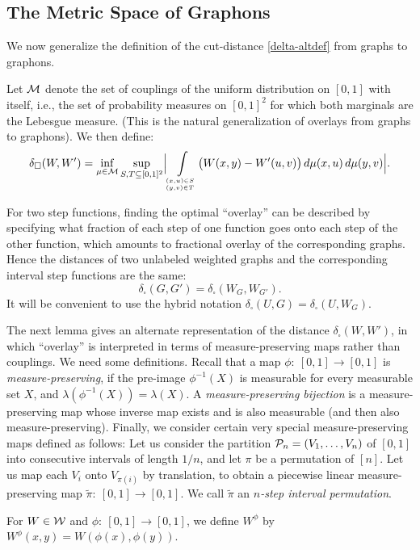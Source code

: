 \documentclass[12pt]{article}
\numberwithin{equation}{section}
\def\MM{{\cal M}}\def\NN{{\cal N}}\def\OO{{\cal O}}
\def\PP{{\cal P}}\def\QQ{{\cal Q}}\def\RR{{\cal R}}
\def\ontop#1#2{\genfrac{}{}{0pt}{}{#1}{#2}}
\begin{document}
\subsection{The Metric Space of Graphons}
\label{sec:FunctDist}

We now generalize the definition of the cut-distance
\eqref{delta-altdef}  from graphs to graphons.

Let $\MM$ denote the set of couplings of the uniform distribution on
$[0,1]$ with itself, i.e.,  the set of probability measures on
$[0,1]^2$ for which both marginals are the Lebesgue measure. (This
is the natural generalization of overlays from graphs to graphons).
We then define:
\[
\delta_\square(W,W')=\inf_{\mu\in\MM}\sup_{S,T\subseteq[0,1]^2}
\Bigl|\int\limits_{\ontop{(x,u)\in S}{(y,v)\in T}}
\bigl(W(x,y)-W'(u,v)\bigr)\,d\mu(x,u)\,d\mu(y,v)\Bigr|.
\]

For two step functions, finding the optimal ``overlay'' can be
described by specifying what fraction of each step of one function
goes onto each step of the other function, which amounts to
fractional overlay of the corresponding graphs. Hence the distances
of two unlabeled weighted graphs and the corresponding interval
step functions are the same:
\begin{equation}\label{STEPSAME}
\delta_\square(G,G') = \delta_\square(W_G,W_{G'}).
\end{equation}
It will be convenient to use the hybrid notation
$\delta_\square(U,G) = \delta_\square(U,W_G)$.

The next lemma gives an alternate representation of the distance
$\delta_\square(W,W')$, in which ``overlay'' is interpreted in terms
of measure-preserving maps rather than couplings. We need some
definitions. Recall that a map $\phi:~[0,1]\to[0,1]$ is {\it
measure-preserving}, if {the pre-image} $\phi^{-1}(X)$ is measurable
for every measurable set $X$, and
$\lambda(\phi^{-1}(X))=\lambda(X)$. A {\it measure-preserving
bijection} is a measure-preserving map whose inverse map exists and
is also measurable (and then also measure-preserving). Finally, we
consider certain very special measure-preserving maps defined as
follows: Let us consider the partition $\PP_n=(V_1,\dots,V_n)$ of
$[0,1]$ into consecutive intervals of length $1/n$, and let $\pi$ be
a permutation of $[n]$. Let us map each $V_i$ onto $V_{\pi(i)}$ by
translation, to obtain a piecewise linear measure-preserving map
$\tilde{\pi}:~[0,1]\to[0,1]$. We call $\tilde{\pi}$ an {\it $n$-step
interval permutation}.

For $W\in {\cal W}$ and $\phi:~[0,1]\to[0,1]$, we define $W^\phi$ by
$W^\phi(x,y)=W(\phi(x),\phi(y))$.
\end{document}
